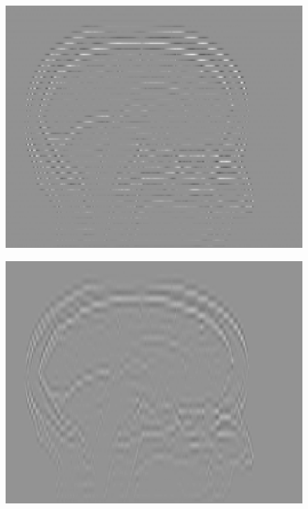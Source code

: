 \documentclass[fleqn,a4paper,oneside,openany]{book}
\begin{document}
\begin{figure}
\begin{minipage}[b]{150pt}
     \label{fig:radiomics_spline_3mm_high_pass}
     \hspace{100pt}
   \end{minipage}
      \begin{minipage}[b]{150pt}
     \centering
     \includegraphics[trim = 0 0 0 0, clip, scale=0.4]{radiomics_filtering/interpolation_image_hi_5mm_1_hi.png}
     \label{fig:radiomics_linear_5mm_high_pass}
     \hspace{100pt}
   \end{minipage}
   \begin{minipage}[b]{150pt}
     \centering
     \includegraphics[trim = 0 0 0 0, clip, scale=0.4]{radiomics_filtering/interpolation_image_hi_5mm_3_hi.png}

\end{minipage}
\end{figure}
\end{document}
